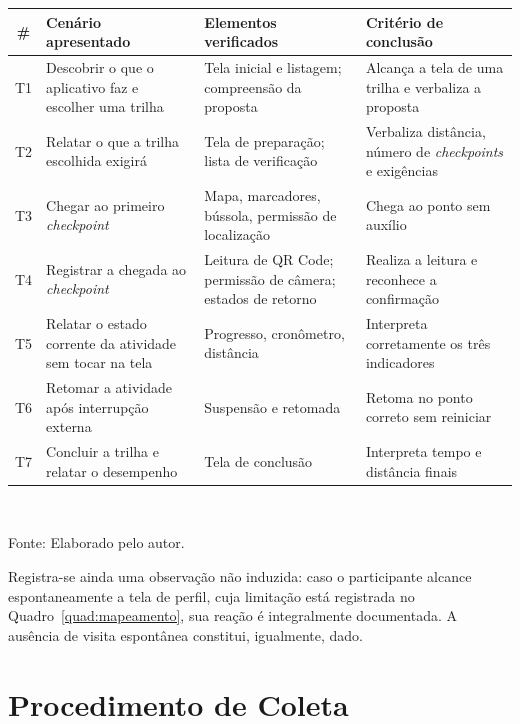 \begin{quadro}[htb]
\centering
\caption{Roteiro de tarefas do estudo empírico}
\label{quad:tarefas}
\footnotesize
\begin{tabular}{c p{4.4cm} p{3.4cm} p{3.2cm}}
\toprule
\textbf{\#} & \textbf{Cenário apresentado} & \textbf{Elementos verificados} &
\textbf{Critério de conclusão} \\
\midrule
T1 & Descobrir o que o aplicativo faz e escolher uma trilha & Tela inicial e
listagem; compreensão da proposta & Alcança a tela de uma trilha e verbaliza a
proposta \\
\addlinespace
T2 & Relatar o que a trilha escolhida exigirá & Tela de preparação; lista de
verificação & Verbaliza distância, número de \textit{checkpoints} e exigências \\
\addlinespace
T3 & Chegar ao primeiro \textit{checkpoint} & Mapa, marcadores, bússola,
permissão de localização & Chega ao ponto sem auxílio \\
\addlinespace
T4 & Registrar a chegada ao \textit{checkpoint} & Leitura de QR Code; permissão de
câmera; estados de retorno & Realiza a leitura e reconhece a confirmação \\
\addlinespace
T5 & Relatar o estado corrente da atividade sem tocar na tela & Progresso,
cronômetro, distância & Interpreta corretamente os três indicadores \\
\addlinespace
T6 & Retomar a atividade após interrupção externa & Suspensão e retomada & Retoma
no ponto correto sem reiniciar \\
\addlinespace
T7 & Concluir a trilha e relatar o desempenho & Tela de conclusão & Interpreta
tempo e distância finais \\
\bottomrule
\end{tabular}
\\[4pt]
\begin{flushleft}
Fonte: Elaborado pelo autor.
\end{flushleft}
\end{quadro}

Registra-se ainda uma observação não induzida: caso o participante alcance
espontaneamente a tela de perfil, cuja limitação está registrada no
Quadro~\ref{quad:mapeamento}, sua reação é integralmente documentada. A ausência de
visita espontânea constitui, igualmente, dado.

\section{Procedimento de Coleta}
\label{sec:procedimento}

